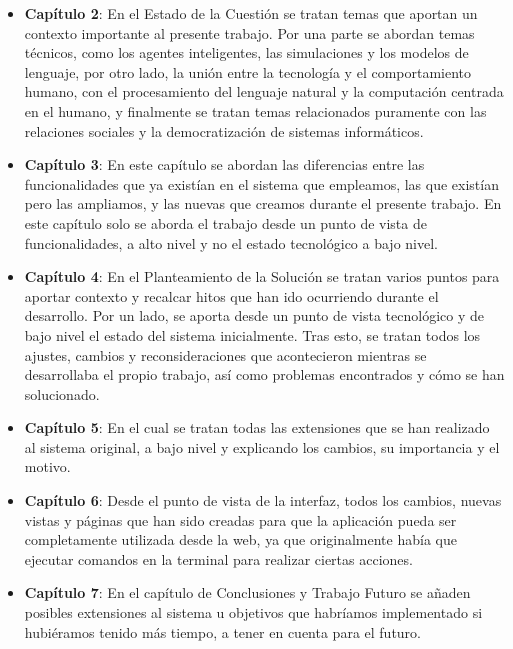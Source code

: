 \begin{itemize}
	
	\item \textbf{Capítulo 2}: En el Estado de la Cuestión se tratan temas que aportan un contexto importante al presente trabajo. Por una parte se abordan temas técnicos, como los agentes inteligentes, las simulaciones y los modelos de lenguaje, por otro lado, la unión entre la tecnología y el comportamiento humano, con el procesamiento del lenguaje natural y la computación centrada en el humano, y finalmente se tratan temas relacionados puramente con las relaciones sociales y la democratización de sistemas informáticos.
	
	\item \textbf{Capítulo 3}: En este capítulo se abordan las diferencias entre las funcionalidades que ya existían en el sistema que empleamos, las que existían pero las ampliamos, y las nuevas que creamos durante el presente trabajo. En este capítulo solo se aborda el trabajo desde un punto de vista de funcionalidades, a alto nivel y no el estado tecnológico a bajo nivel.
	
	\item \textbf{Capítulo 4}: En el Planteamiento de la Solución se tratan varios puntos para aportar contexto y recalcar hitos que han ido ocurriendo durante el desarrollo. Por un lado, se aporta desde un punto de vista tecnológico y de bajo nivel el estado del sistema inicialmente. Tras esto, se tratan todos los ajustes, cambios y reconsideraciones que acontecieron mientras se desarrollaba el propio trabajo, así como problemas encontrados y cómo se han solucionado.
	
	\item \textbf{Capítulo 5}: En el cual se tratan todas las extensiones que se han realizado al sistema original, a bajo nivel y explicando los cambios, su importancia y el motivo.
	
	\item \textbf{Capítulo 6}: Desde el punto de vista de la interfaz, todos los cambios, nuevas vistas y páginas que han sido creadas para que la aplicación pueda ser completamente utilizada desde la web, ya que originalmente había que ejecutar comandos en la terminal para realizar ciertas acciones.
	
	\item \textbf{Capítulo 7}: En el capítulo de Conclusiones y Trabajo Futuro se añaden posibles extensiones al sistema u objetivos que habríamos implementado si hubiéramos tenido más tiempo, a tener en cuenta para el futuro.
	
\end{itemize}
